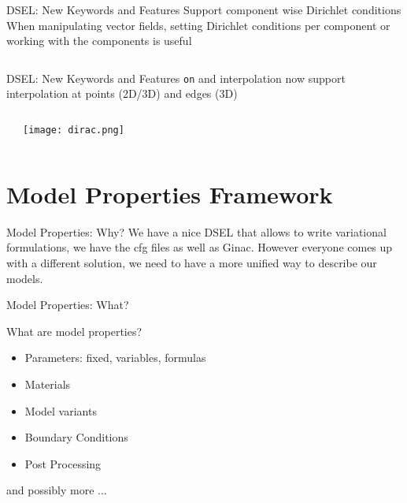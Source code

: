 \begin{frame}[fragile]{DSEL: New Keywords and Features}
  \alert{Support component wise Dirichlet conditions}
  When manipulating vector fields, setting Dirichlet conditions per
  component or working with the components is useful
  \inputminted[fontsize=\scriptsize]{c++}{Codes/prudhomme/fud4/elas.cpp}
\end{frame}

\begin{frame}[fragile]{DSEL: New Keywords and Features}
  \alert{\texttt{on} and interpolation now support
  interpolation at points (2D/3D) and edges (3D)}
\begin{columns}[c]
  \inputminted[fontsize=\tiny]{c++}{Codes/prudhomme/fud4/on.cpp}
  \texttt{[image: dirac.png]}
\end{columns}

\end{frame}

\section{Model Properties Framework}

\begin{frame}{Model Properties: Why?}
  We have a nice DSEL that allows to write variational formulations,
  we have the cfg files as well as Ginac. However everyone comes up
  with a different solution, we need to have a more unified way to
  describe our models.

  \centering
  \vfill\vspace{1em}\vfill
\end{frame}

\begin{frame}{Model Properties: What?}

What are model properties?
\begin{itemize}
\item Parameters: fixed, variables, formulas
\item Materials
\item Model variants
\item Boundary Conditions
\item Post Processing
\end{itemize}
and possibly more ...

\end{frame}

